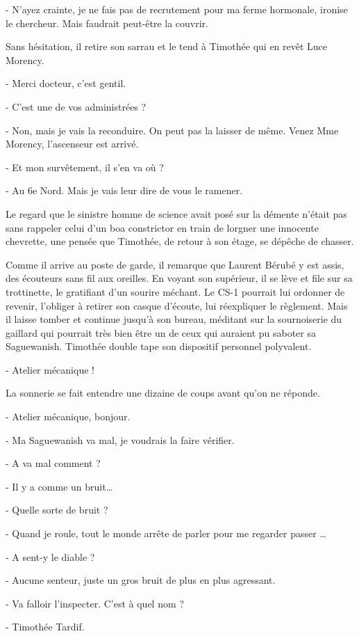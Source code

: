 - N’ayez crainte, je ne fais pas de recrutement pour ma ferme hormonale, ironise le chercheur. Mais faudrait peut-être la couvrir.

Sans hésitation, il retire son sarrau et le tend à Timothée qui en revêt Luce Morency.

- Merci docteur, c’est gentil.

- C’est une de vos administrées ?

- Non, mais je vais la reconduire. On peut pas la laisser de même. Venez Mme Morency, l’ascenseur est arrivé.

- Et mon survêtement, il s’en va où ?

- Au 6e Nord. Mais je vais leur dire de vous le ramener.

Le regard que le sinistre homme de science avait posé sur la démente n’était pas sans rappeler celui d’un boa constrictor en train de lorgner une innocente chevrette, une pensée que Timothée, de retour à son étage, se dépêche de chasser.

Comme il arrive au poste de garde, il remarque que Laurent Bérubé y est assis, des écouteurs sans fil aux oreilles. En voyant son supérieur, il se lève et file sur sa trottinette, le gratifiant d’un sourire méchant. Le CS-1 pourrait lui ordonner de revenir, l’obliger à retirer son casque d’écoute, lui réexpliquer le règlement. Mais il laisse tomber et continue jusqu’à son bureau, méditant sur la sournoiserie du gaillard qui pourrait très bien être un de ceux qui auraient pu saboter sa Saguewanish. Timothée double tape son dispositif personnel polyvalent.

- Atelier mécanique !

La sonnerie se fait entendre une dizaine de coups avant qu’on ne réponde.

- Atelier mécanique, bonjour.

- Ma Saguewanish va mal, je voudrais la faire vérifier.

- A va mal comment ?

- Il y a comme un bruit…

- Quelle sorte de bruit ?

- Quand je roule, tout le monde arrête de parler pour me regarder passer …

- A sent-y le diable ?

- Aucune senteur, juste un gros bruit de plus en plus agressant.

- Va falloir l’inspecter. C’est à quel nom ?

- Timothée Tardif.

